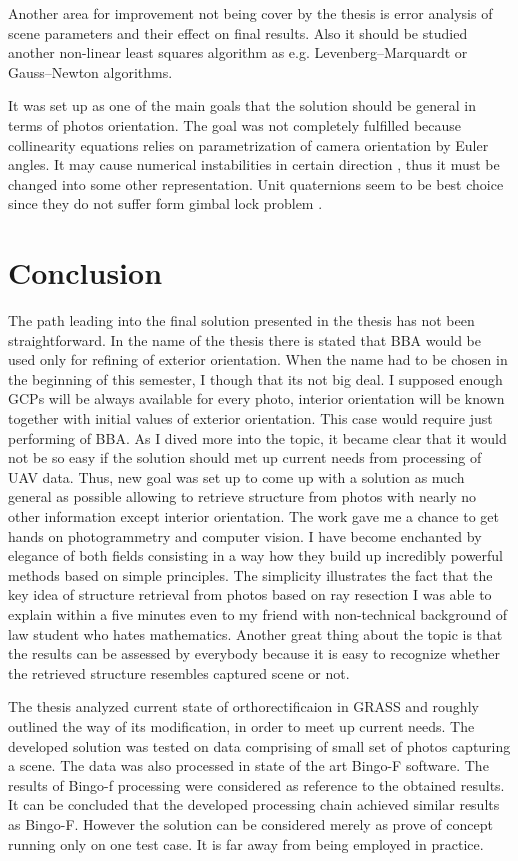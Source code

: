 \documentclass[a4paper,12pt]{article}
\begin{document}
Another area for improvement not being cover by the thesis is error analysis of scene parameters and their 
effect on final results. Also it should be studied another non-linear least squares algorithm as e.g. Levenberg–Marquardt or 
Gauss–Newton  algorithms. 

It was set up as one of the main goals that the solution should be general in terms of photos orientation.
The goal was not completely fulfilled because collinearity equations relies on parametrization of camera orientation by Euler angles.
It may cause numerical instabilities in certain direction \label{sec:eo}, thus it must be changed into some other representation.
Unit quaternions seem to be best choice since they do not suffer form gimbal lock problem \cite{schmidt2001using}.

\section{Conclusion}

The path leading into the final solution presented in the thesis has not been straightforward.
In the name of the thesis there is stated that BBA would be 
used only for refining of exterior orientation. When the name had to be chosen in the beginning of this semester, I though that 
its not big deal. 
I supposed enough GCPs will be 
always available for every photo, interior orientation will be 
known together with initial values of exterior orientation.
This case would require just
performing of BBA.
As I dived more into the topic, it became clear that it would not be so easy 
 if the solution should met up current needs from processing of UAV data.
Thus, new goal was set up to come up with a solution as much general 
 as possible allowing to retrieve structure from photos with nearly no other information except interior orientation.
The work gave me a chance to get hands on photogrammetry and computer vision. I have become enchanted
by elegance of both fields consisting in a way how they build up incredibly powerful methods based on simple principles.  
The simplicity illustrates the fact that the key idea of structure retrieval from photos based on ray resection
I was able to explain within a five minutes even to my friend with non-technical background of law student who 
  hates mathematics.
Another great thing about the topic is that the results can be assessed
by everybody because it is easy to recognize whether the retrieved structure resembles captured scene or not. 

 The thesis analyzed current state of orthorectificaion in GRASS and roughly outlined the way of its modification,
 in order to meet up current needs. 
  The developed solution was tested on data comprising of small set of photos capturing a scene.
  The data was also processed in state of the art Bingo-F software. The results of Bingo-f processing were considered as reference
  to the obtained results.
  It can be concluded that the developed processing 
  chain achieved similar results as Bingo-F. However the solution can be considered merely as prove of concept 
  running only on one test case. It is far away from being employed in practice. 
\end{document}
